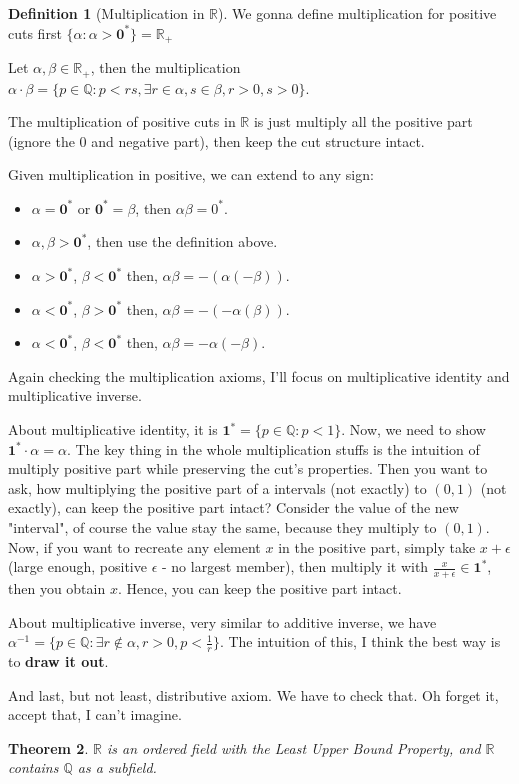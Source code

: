 \documentclass[12pt]{article}
\newcommand{\RR}{\mathbb{R}}   %
\newcommand{\QQ}{\mathbb{Q}}   %
\theoremstyle{definition}
\newtheorem{definition}{Definition}[section]
\theoremstyle{plain}
\newtheorem{theorem}[definition]{Theorem}
\begin{document}
\begin{definition}[Multiplication in $\RR$]
We gonna define multiplication for positive cuts first $\{\alpha: \alpha >\mathbf{0}^*\} = \RR_+$

Let $\alpha, \beta \in \RR_+$, then the multiplication $\alpha \cdot \beta = \{p \in \QQ: p < rs, \exists r \in \alpha, s\in\beta, r>0, s>0\}$.
\end{definition}

\begin{note}
The multiplication of positive cuts in $\RR$ is just multiply all the positive part (ignore the 0 and negative part), then keep the cut structure intact.

Given multiplication in positive, we can extend to any sign:
\begin{itemize}
    \item $\alpha = \mathbf{0}^*$ or $\mathbf{0}^* = \beta$, then $\alpha\beta=0^*$.
    \item $\alpha, \beta>\mathbf{0}^*$, then use the definition above.
    \item $\alpha > \mathbf{0}^*$, $\beta < \mathbf{0}^*$ then, $\alpha\beta = -(\alpha(-\beta))$.
    \item $\alpha < \mathbf{0}^*$, $\beta > \mathbf{0}^*$ then, $\alpha\beta = -(-\alpha(\beta))$.
    \item $\alpha < \mathbf{0}^*$, $\beta < \mathbf{0}^*$ then, $\alpha\beta = -\alpha(-\beta)$.
\end{itemize}
\end{note}

\begin{note}
Again checking the multiplication axioms, I'll focus on multiplicative identity and multiplicative inverse.

About multiplicative identity, it is $\mathbf{1}^* = \{p\in\QQ:p<1\}$. Now, we need to show $\mathbf{1}^* \cdot \alpha = \alpha$. The key thing in the whole multiplication stuffs is the intuition of multiply positive part while preserving the cut's properties. Then you want to ask, how multiplying the positive part of a intervals (not exactly) to $(0,1)$ (not exactly), can keep the positive part intact? Consider the value of the new "interval", of course the value stay the same, because they multiply to $(0,1)$. Now, if you want to recreate any element $x$ in the positive part, simply take $x + \epsilon$ (large enough, positive $\epsilon$ - no largest member), then multiply it with $\frac{x}{x+\epsilon} \in \mathbf{1}^*$, then you obtain $x$. Hence, you can keep the positive part intact.

About multiplicative inverse, very similar to additive inverse, we have $\alpha^{-1} = \{p \in \QQ: \exists r \notin \alpha, r>0, p < \frac{1}{r}\}$. The intuition of this, I think the best way is to \textbf{draw it out}.
\end{note}

\begin{note}
And last, but not least, distributive axiom. We have to check that. Oh forget it, accept that, I can't imagine.
\end{note}


\begin{theorem}
$\RR$ is an ordered field with the Least Upper Bound Property, and $\RR$ contains $\QQ$ as a subfield.
\end{theorem}
\end{document}
